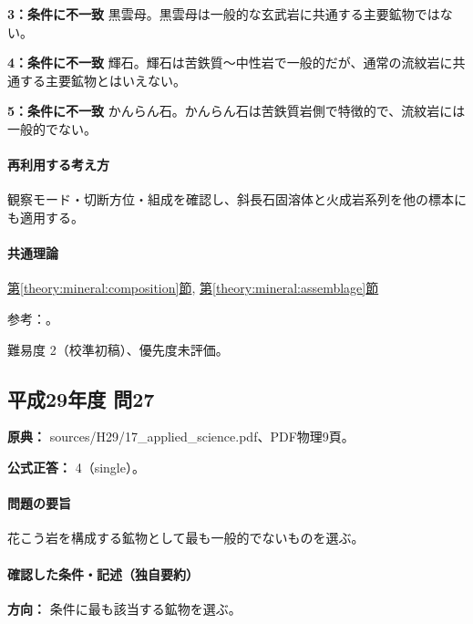 \noindent\textbf{3：条件に不一致} 黒雲母。黒雲母は一般的な玄武岩に共通する主要鉱物ではない。\par

\noindent\textbf{4：条件に不一致} 輝石。輝石は苦鉄質〜中性岩で一般的だが、通常の流紋岩に共通する主要鉱物とはいえない。\par

\noindent\textbf{5：条件に不一致} かんらん石。かんらん石は苦鉄質岩側で特徴的で、流紋岩には一般的でない。\par

\paragraph{再利用する考え方} 観察モード・切断方位・組成を確認し、斜長石固溶体と火成岩系列を他の標本にも適用する。

\paragraph{共通理論} \hyperref[theory:mineral:composition]{第\ref*{theory:mineral:composition}節}, \hyperref[theory:mineral:assemblage]{第\ref*{theory:mineral:assemblage}節}

\par 参考：\cite{hom_albite,hom_anorthite,usgs_igneous_components}。

\par 難易度 2（校準初稿）、優先度未評価。

\subsection{平成29年度 問27}
\label{q:h29-reg-applied-27}

\noindent\textbf{原典：} sources/H29/17\_applied\_science.pdf、PDF物理9頁。

\textbf{公式正答：} 4（single）。

\paragraph{問題の要旨} 花こう岩を構成する鉱物として最も一般的でないものを選ぶ。

\paragraph{確認した条件・記述（独自要約）}\mbox{}\par

\noindent\textbf{方向：} 条件に最も該当する鉱物を選ぶ。\par

